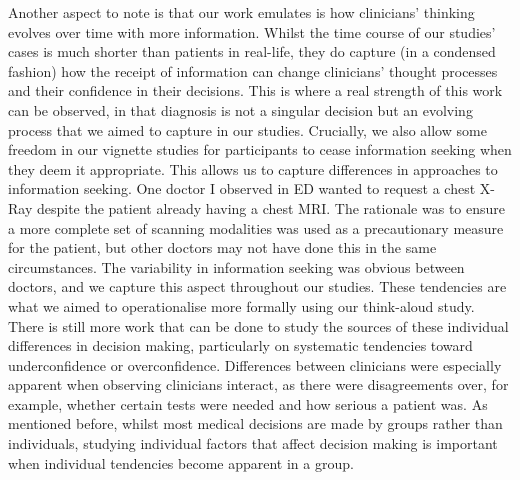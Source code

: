 \documentclass[a4paper, nobind]{templates/ociamthesis}
\begin{document}
\hfill\break
Another aspect to note is that our work emulates is how clinicians' thinking evolves over time with more information. Whilst the time course of our studies' cases is much shorter than patients in real-life, they do capture (in a condensed fashion) how the receipt of information can change clinicians' thought processes and their confidence in their decisions. This is where a real strength of this work can be observed, in that diagnosis is not a singular decision but an evolving process that we aimed to capture in our studies. Crucially, we also allow some freedom in our vignette studies for participants to cease information seeking when they deem it appropriate. This allows us to capture differences in approaches to information seeking. One doctor I observed in ED wanted to request a chest X-Ray despite the patient already having a chest MRI. The rationale was to ensure a more complete set of scanning modalities was used as a precautionary measure for the patient, but other doctors may not have done this in the same circumstances. The variability in information seeking was obvious between doctors, and we capture this aspect throughout our studies. These tendencies are what we aimed to operationalise more formally using our think-aloud study. There is still more work that can be done to study the sources of these individual differences in decision making, particularly on systematic tendencies toward underconfidence or overconfidence. Differences between clinicians were especially apparent when observing clinicians interact, as there were disagreements over, for example, whether certain tests were needed and how serious a patient was. As mentioned before, whilst most medical decisions are made by groups rather than individuals, studying individual factors that affect decision making is important when individual tendencies become apparent in a group.
\end{document}
